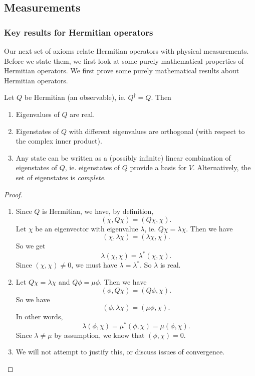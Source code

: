 \documentclass[a4paper]{article}
\begin{document}
\subsection{Measurements}
\subsubsection*{Key results for Hermitian operators}
Our next set of axioms relate Hermitian operators with physical measurements. Before we state them, we first look at some purely mathematical properties of Hermitian operators.
We first prove some purely mathematical results about Hermitian operators.
\begin{prop}
  Let $Q$ be Hermitian (an observable), ie. $Q^\dagger = Q$. Then
  \begin{enumerate}
    \item Eigenvalues of $Q$ are real.
    \item Eigenstates of $Q$ with different eigenvalues are orthogonal (with respect to the complex inner product).
    \item Any state can be written as a (possibly infinite) linear combination of eigenstates of $Q$, ie. eigenstates of $Q$ provide a basis for $V$. Alternatively, the set of eigenstates is \emph{complete}.
  \end{enumerate}
\end{prop}

\begin{proof}\leavevmode
  \begin{enumerate}
    \item Since $Q$ is Hermitian, we have, by definition,
      \[
        (\chi, Q\chi) = (Q\chi, \chi).
      \]
      Let $\chi$ be an eigenvector with eigenvalue $\lambda$, ie. $Q\chi = \lambda \chi$. Then we have
      \[
        (\chi, \lambda \chi) = (\lambda \chi, \chi).
      \]
      So we get
      \[
        \lambda (\chi, \chi) = \lambda^*(\chi, \chi).
      \]
      Since $(\chi, \chi)\not= 0$, we must have $\lambda = \lambda^*$. So $\lambda$ is real.
    \item Let $Q \chi = \lambda \chi$ and $Q \phi = \mu \phi$. Then we have
      \[
        (\phi, Q\chi) = (Q\phi, \chi).
      \]
      So we have
      \[
        (\phi, \lambda\chi) = (\mu \phi, \chi).
      \]
      In other words,
      \[
        \lambda (\phi, \chi) = \mu^* (\phi, \chi) = \mu (\phi, \chi).
      \]
      Since $\lambda \not= \mu$ by assumption, we know that $(\phi, \chi) = 0$.
    \item We will not attempt to justify this, or discuss issues of convergence.
  \end{enumerate}
\end{proof}
\end{document}
